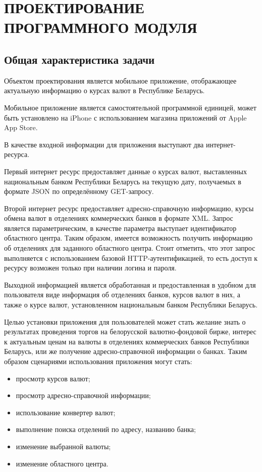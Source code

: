 \section[Проектирование программного модуля]{%
  ПРОЕКТИРОВАНИЕ ПРОГРАММНОГО МОДУЛЯ
}

\label{sec:design}


\subsection{Общая характеристика задачи}

Объектом проектирования является мобильное приложение,
отображающее актуальную информацию о курсах валют в Республике Беларусь.

Мобильное приложение является самостоятельной программной единицей,
может быть установлено на iPhone с
использованием магазина приложений от Apple App Store.

В качестве входной информации для приложения выступают два интернет-ресурса.

Первый интернет ресурс предоставляет данные о курсах валют, выставленных
национальным банком Республики Беларусь на текущую дату,
получаемых в формате JSON по определённому GET-запросу.

Второй интернет ресурс предоставляет адресно-справочную информацию,
курсы обмена валют в отделениях коммерческих банков в формате XML. Запрос
является параметрическим, в качестве параметра выступает идентификатор
областного центра. Таким образом, имеется возможность получить информацию
об отделениях для заданного областного центра. Стоит отметить, что этот запрос
выполняется с использованием базовой HTTP-аутентификацией, то есть доступ
к ресурсу возможен только при наличии логина и пароля.

Выходной информацией является обработанная и предоставленная в удобном для
пользователя виде информация об отделениях банков, курсов валют в них,
а также о курсе валют, установленном национальным банком Республики Беларусь.

Целью установки приложения для пользователей может стать желание знать о
результатах проведения торгов на белорусской валютно-фондовой бирже,
интерес к актуальным ценам на валюты в отделениях коммерческих банков
Республики Беларусь, или же получение адресно-справочной информации о банках.
Таким образом сценариями использования приложения могут стать:
\begin{itemize}
  \item просмотр курсов валют;
  \item просмотр адресно-справочной информации;
  \item использование конвертер валют;
  \item выполнение поиска отделений по адресу, названию банка;
  \item изменение выбранной валюты;
  \item изменение областного центра.
\end{itemize}

